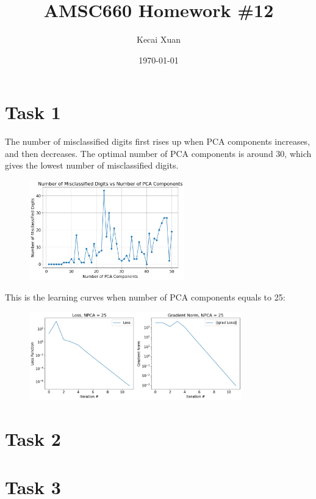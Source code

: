 \documentclass[12pt]{article}
\begin{document}
\setlength{\parindent}{0pt}

\title{AMSC660 Homework \#12}
\author{Kecai Xuan}
\date{\today}
\maketitle

\section*{Task 1}

The number of misclassified digits first rises up when PCA components increases, and then decreases. The optimal number of PCA components is around 30, which gives the lowest number of misclassified digits.

\begin{figure}[ht]
    \centering
    \includegraphics[width=0.6\textwidth]{component.png}
\end{figure}

This is the learning curves when number of PCA components equals to 25:
\begin{figure}[ht]
    \centering
    \includegraphics[width=0.82\textwidth]{loss.png}
\end{figure}


\section*{Task 2}



\section*{Task 3}
\end{document}

